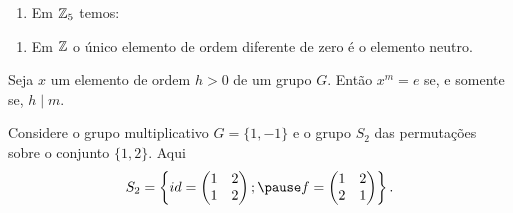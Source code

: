 \documentclass{beamer}
\begin{document}
    \begin{frame}
        \begin{exemplos}
            \begin{enumerate}[label={\roman*})]
                \conti

                \item Em $\mathbb{Z}_5$ temos:
                \seti
            \end{enumerate}
        \end{exemplos}
    \end{frame}

    \begin{frame}
        \begin{exemplos}
            \begin{enumerate}[label={\roman*})]
                \conti

                \item Em $\mathbb{Z}$ \pause o único elemento de ordem diferente de zero \pause é o elemento neutro.
            \end{enumerate}
        \end{exemplos}
    \end{frame}

    \begin{frame}
        \begin{proposicao}
            Seja $x$ um elemento de ordem $h > 0$ \pause de um grupo $G$. \pause Então $x^m = e$ \pause se, e somente se, $h \mid m$.
        \end{proposicao}
    \end{frame}

    \begin{frame}
        Considere o grupo multiplicativo $G = \{1, -1\}$ \pause e o grupo $S_2$ das permutações sobre o conjunto $\{1,2\}$. \pause Aqui
        \[
            S_2 = \left\{id = \begin{pmatrix}
                1 & 2\\1 & 2
            \end{pmatrix}; \pause f = \begin{pmatrix}
                1 & 2\\2 & 1
            \end{pmatrix}\right\}.
        \]
    \end{frame}
\end{document}
